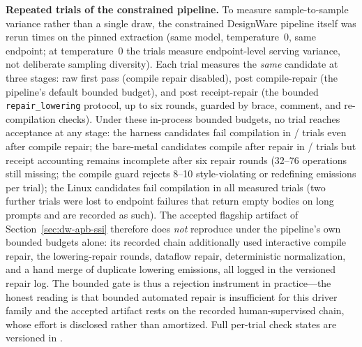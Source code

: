 \textbf{Repeated trials of the constrained pipeline.} To measure
sample-to-sample variance rather than a single draw, the constrained
DesignWare pipeline itself was rerun \TrialsK{} times on the pinned
extraction (same model, temperature~0, same endpoint; at temperature~0 the
trials measure endpoint-level serving variance, not deliberate sampling
diversity). Each trial measures the \emph{same} candidate at three stages:
raw first pass (compile repair disabled), post compile-repair (the
pipeline's default bounded budget), and post receipt-repair (the bounded
\texttt{repair\_lowering} protocol, up to six rounds, guarded by brace,
comment, and re-compilation checks). Under these in-process bounded
budgets, no trial reaches acceptance at any stage: the harness candidates
fail compilation in \DwHarnTrialsN{}/\DwHarnTrialsN{} trials even after
compile repair; the bare-metal candidates compile after repair in
\DwBareTrialsPostCompile{}/\DwBareTrialsN{} trials but receipt accounting
remains incomplete after six repair rounds (32--76 operations still
missing; the compile guard rejects 8--10 style-violating or redefining
emissions per trial); the Linux candidates fail compilation in all
\DwLinuxTrialsN{} measured trials (two further trials were lost to
endpoint failures that return empty bodies on long prompts and are
recorded as such). The accepted flagship artifact of
Section~\ref{sec:dw-apb-ssi} therefore does \emph{not} reproduce under the
pipeline's own bounded budgets alone: its recorded chain additionally used
interactive compile repair, the lowering-repair rounds, dataflow repair,
deterministic normalization, and a hand merge of duplicate lowering
emissions, all logged in the versioned repair log. The bounded gate is
thus a rejection instrument in practice---the honest reading is that
bounded automated repair is insufficient for this driver family and the
accepted artifact rests on the recorded human-supervised chain, whose
effort is disclosed rather than amortized. Full per-trial check states are
versioned in .

